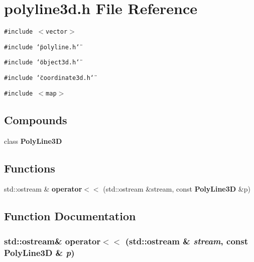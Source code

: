 \section{polyline3d.h File Reference}
\label{polyline3d_8h}
{\tt \#include $<$vector$>$}\par
{\tt \#include \char`\"{}polyline.h\char`\"{}}\par
{\tt \#include \char`\"{}object3d.h\char`\"{}}\par
{\tt \#include \char`\"{}coordinate3d.h\char`\"{}}\par
{\tt \#include $<$map$>$}\par
\subsection*{Compounds}
\begin{CompactItemize}
\item 
class {\bf Poly\-Line3D}
\end{CompactItemize}
\subsection*{Functions}
\begin{CompactItemize}
\item 
std::ostream \& {\bf operator$<$$<$} (std::ostream \&stream, const {\bf Poly\-Line3D} \&p)
\end{CompactItemize}


\subsection{Function Documentation}
\subsubsection{\setlength{\rightskip}{0pt plus 5cm}std::ostream\& operator$<$$<$ (std::ostream \& {\em stream}, const {\bf Poly\-Line3D} \& {\em p})\hspace{0.3cm}{\tt  [inline]}}\label{polyline3d_8h_a0}


